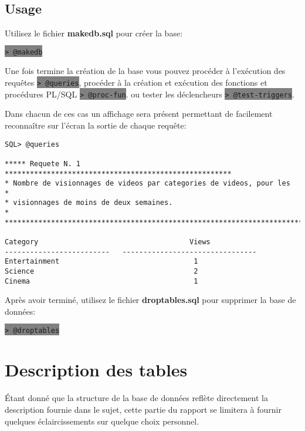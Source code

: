 \documentclass[twoside,openright,a4paper,11pt,french]{article}
\begin{document}
\subsection{Usage}
Utilisez le fichier {\bf makedb.sql} pour créer la base:
\begin{center}
\colorbox{gray}{\lstinline[basicstyle=\ttfamily\color{black}]|> @makedb|}
\end{center}
Une fois termine la création de la base vous pouvez procéder à l'exécution des requêtes
\colorbox{gray}{\lstinline[basicstyle=\ttfamily\color{black}]|> @queries|},
procéder à la création et exécution des fonctions et procédures PL/SQL
\colorbox{gray}{\lstinline[basicstyle=\ttfamily\color{black}]|> @proc-fun|}.
ou tester les déclencheurs
\colorbox{gray}{\lstinline[basicstyle=\ttfamily\color{black}]|> @test-triggers|}.

\smallbreak
Dans chacun de ces cas un affichage sera présent permettant de facilement
reconnaître  sur l'écran la sortie de chaque requête:
\vspace{1cm}

\begin{lstlisting}
SQL> @queries

***** Requete N. 1 ******************************************************
* Nombre de visionnages de videos par categories de videos, pour les            *
* visionnages de moins de deux semaines.                                        *
*************************************************************************

Category                                    Views
-------------------------   --------------------------------
Entertainment                                1
Science                                      2
Cinema                                       1
\end{lstlisting}

\vspace{1cm}
Après avoir terminé, utilisez le fichier {\bf droptables.sql} pour supprimer la base de données:
\begin{center}
\colorbox{gray}{\lstinline[basicstyle=\ttfamily\color{black}]|> @droptables|}
\end{center}

\newpage 
\section{Description des tables}
Étant donné que la structure de la base de données reflète directement la
description fournie dans le sujet, cette partie du rapport se limitera à
fournir quelques éclaircissements sur quelque choix personnel.
\end{document}
